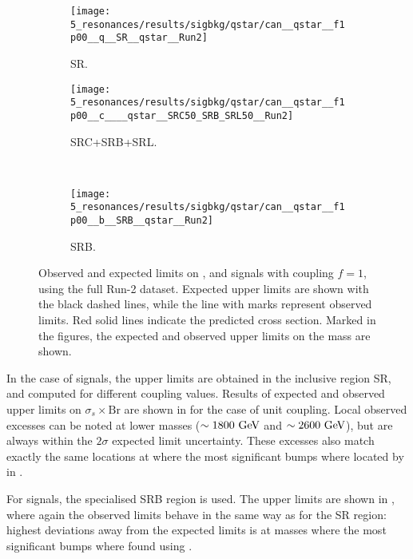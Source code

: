 \begin{figure}[ht!]
    \centering
    \begin{subfigure}[t]{0.49\linewidth}
        \centering
        \texttt{[image: 5\_resonances/results/sigbkg/qstar/can\_\_qstar\_\_f1p00\_\_q\_\_SR\_\_qstar\_\_Run2]}
        \caption{SR.}
        \label{fig:results:results:bkgsig:results:qstar:limits:SR}
    \end{subfigure}
    \hfill
    \begin{subfigure}[t]{0.49\linewidth}
        \centering
        \texttt{[image: 5\_resonances/results/sigbkg/qstar/can\_\_qstar\_\_f1p00\_\_c\_\_\_\_qstar\_\_SRC50\_SRB\_SRL50\_\_Run2]}
        \caption{SRC+SRB+SRL.}
        \label{fig:results:results:bkgsig:results:qstar:limits:SRC}
    \end{subfigure}\\
    \begin{subfigure}[t]{0.49\linewidth}
        \centering
        \texttt{[image: 5\_resonances/results/sigbkg/qstar/can\_\_qstar\_\_f1p00\_\_b\_\_SRB\_\_qstar\_\_Run2]}
        \caption{SRB.}
        \label{fig:results:results:bkgsig:results:qstar:limits:SRB}
    \end{subfigure}
    \caption{Observed and expected limits on \qstar, \cstar and \bstar signals with coupling \(f=1\), using the full Run-2 dataset. Expected upper limits are shown with the black dashed lines, while the line with marks represent observed limits. Red solid lines indicate the predicted cross section. Marked in the figures, the expected and observed upper limits on the mass are shown.}
    \label{fig:results:results:bkgsig:results:qstar:limits}
\end{figure}

In the case of \qstar signals, the upper limits are obtained in the inclusive region SR, and computed for different coupling values. Results of expected and observed upper limits on \(\sigma_s \times \text{Br}\) are shown in \Fig{\ref{fig:results:results:bkgsig:results:qstar:limits:SR}} for the case of unit coupling. Local observed excesses can be noted at lower masses (\(\sim 1800~\text{GeV}\) and \(\sim 2600~\text{GeV}\)), but are always within the \(2\sigma\) expected limit uncertainty. These excesses also match exactly the same locations at where the most significant bumps where located by \bh in \Fig{\ref{fig:results:results:bkgonly:bh:SR}}.

For \bstar signals, the specialised SRB region is used. The upper limits are shown in \Fig{\ref{fig:results:results:bkgsig:results:qstar:limits:SRB}}, where again the observed limits behave in the same way as for the SR region: highest deviations away from the expected limits is at masses where the most significant bumps where found using \bh.

